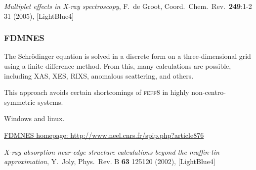 \documentclass[10pt, xcolor=x11names, compress]{beamer}
\begin{document}
\begin{frame}
\begin{columns}
\begin{column}{0.35\linewidth}
    \end{column}
  \end{columns}
  
  \begin{bottomnote}[0.52][19.25]
    \textit{Multiplet effects in X-ray spectroscopy},
    F.\ de Groot, Coord.\ Chem.\ Rev.\ \textbf{249}:1-2 31 (2005),
    [LightBlue4]
  \end{bottomnote}
\end{frame}

\begin{frame}
  \frametitle{FDMNES}
  The Schr\"odinger equation is solved in a discrete form on a
  three-dimensional grid using a finite difference method.  From this,
  many calculations are possible, including XAS, XES, RIXS, anomalous
  scattering, and others.

  \bigskip
  
  This approach avoids certain shortcomings of \textsc{feff}8 in
  highly non-centro-symmetric systems.

  \bigskip
  
  Windows and linux.

  \bigskip

  \href{http://www.neel.cnrs.fr/spip.php?article876}
  {\color{Blue4}FDMNES homepage:
    http://www.neel.cnrs.fr/spip.php?article876}


  \begin{bottomnote}[0.52][19.25]
    \textit{X-ray absorption near-edge structure calculations beyond
      the muffin-tin approximation}, 
    Y.\ Joly, Phys.\ Rev. B \textbf{63}  125120 (2002),
    [LightBlue4]
  \end{bottomnote}
\end{frame}
\end{document}
